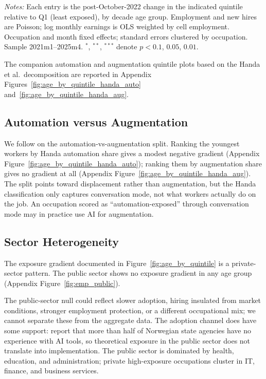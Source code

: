 \begin{table}[tp]
  \centering
  \caption{Cell-level difference-in-differences by AI-exposure quintile, private sector.}
  \label{tab:did_cell}
  
  \begin{minipage}{\textwidth}\footnotesize\textit{Notes:} Each entry is the post-October-2022 change in the indicated quintile relative to Q1 (least exposed), by decade age group. Employment and new hires are Poisson; log monthly earnings is OLS weighted by cell employment. Occupation and month fixed effects; standard errors clustered by occupation. Sample 2021m1--2025m4. $^{*}$, $^{**}$, $^{***}$ denote $p<0.1$, $0.05$, $0.01$.\end{minipage}
\end{table}

The companion automation and augmentation quintile plots based on the Handa et al.\ decomposition are reported in Appendix Figures~\ref{fig:age_by_quintile_handa_auto} and~\ref{fig:age_by_quintile_handa_aug}.


\subsection{Automation versus Augmentation}\label{sec:results:auto_aug}

We follow \citet{brynjolfsson2025} on the automation-vs-augmentation split. Ranking the youngest workers by Handa automation share gives a modest negative gradient (Appendix Figure~\ref{fig:age_by_quintile_handa_auto}); ranking them by augmentation share gives no gradient at all (Appendix Figure~\ref{fig:age_by_quintile_handa_aug}). The split points toward displacement rather than augmentation, but the Handa classification only captures conversation mode, not what workers actually do on the job. An occupation scored as ``automation-exposed'' through conversation mode may in practice use AI for augmentation.


\subsection{Sector Heterogeneity}\label{sec:results:sectors}

The exposure gradient documented in Figure~\ref{fig:age_by_quintile} is a private-sector pattern. The public sector shows no exposure gradient in any age group (Appendix Figure~\ref{fig:emp_public}).

The public-sector null could reflect slower adoption, hiring insulated from market conditions, stronger employment protection, or a different occupational mix; we cannot separate these from the aggregate data. The adoption channel does have some support: \citet{riksrevisjonen2024} report that more than half of Norwegian state agencies have no experience with AI tools, so theoretical exposure in the public sector does not translate into implementation. The public sector is dominated by health, education, and administration; private high-exposure occupations cluster in IT, finance, and business services. 



